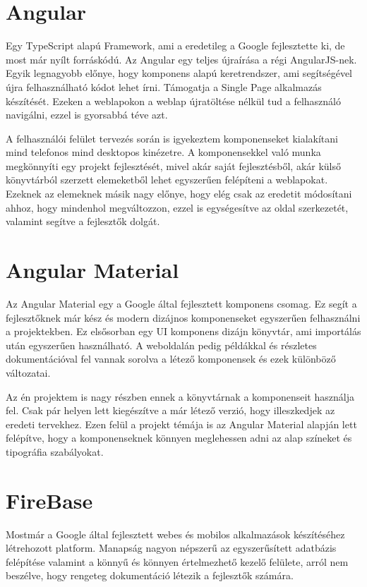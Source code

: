 \documentclass[12pt]{report}
\theoremstyle{definition}
\begin{document}
\section{Angular}
Egy TypeScript alapú Framework, ami a eredetileg a Google fejlesztette ki, de most már nyílt forráskódú. Az Angular egy teljes újraírása a régi AngularJS-nek. Egyik legnagyobb előnye, hogy komponens alapú keretrendszer, ami segítségével újra felhasználható kódot lehet írni. Támogatja a Single Page alkalmazás készítését. Ezeken a weblapokon a weblap újratöltése nélkül tud a felhasználó navigálni, ezzel is gyorsabbá téve azt.

A felhasználói felület tervezés során is igyekeztem komponenseket kialakítani mind telefonos mind desktopos kinézetre. A komponensekkel való munka megkönnyíti egy projekt fejlesztését, mivel akár saját fejlesztésből, akár külső könyvtárból szerzett elemeketből lehet egyszerűen felépíteni a weblapokat. Ezeknek az elemeknek másik nagy előnye, hogy elég csak az eredetit módosítani ahhoz, hogy mindenhol megváltozzon, ezzel is egységesítve az oldal szerkezetét, valamint segítve a fejlesztők dolgát.


\section{Angular Material}
Az Angular Material egy a Google által fejlesztett komponens csomag. Ez segít a fejlesztőknek már kész és modern dizájnos komponenseket egyszerűen felhasználni a projektekben. Ez elsősorban egy UI komponens dizájn könyvtár, ami importálás után egyszerűen használható. A weboldalán pedig példákkal és részletes dokumentációval fel vannak sorolva a létező komponensek és ezek különböző változatai.
	
Az én projektem is nagy részben ennek a könyvtárnak a komponenseit használja fel. Csak pár helyen lett kiegészítve a már létező verzió, hogy illeszkedjek az eredeti tervekhez. Ezen felül a projekt témája is az Angular Material alapján lett felépítve, hogy a komponenseknek könnyen meglehessen adni az alap színeket és tipográfia szabályokat.


\section{FireBase}
Mostmár a Google által fejlesztett webes és mobilos alkalmazások készítéséhez létrehozott platform. Manapság nagyon népszerű az egyszerűsített adatbázis felépítése valamint a könnyű és könnyen értelmezhető kezelő felülete, arról nem beszélve, hogy rengeteg dokumentáció létezik a fejlesztők számára.
\end{document}
